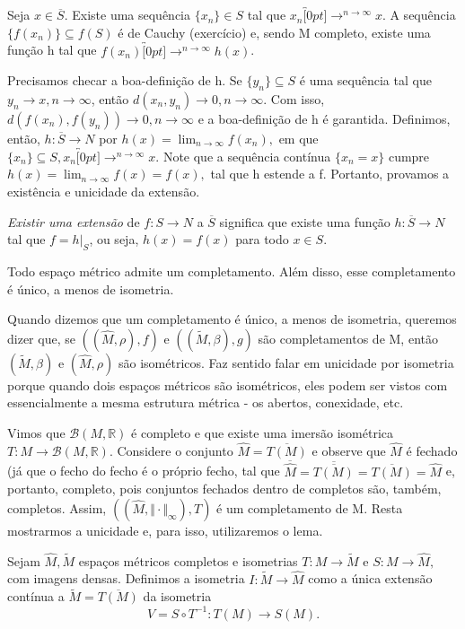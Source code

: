 \documentclass[metric_notes.tex]{subfiles}
\begin{document}
\begin{proof*}
	Seja \(x\in \overline{S}.\) Existe uma sequência \(\{x_{n}\}\in S\) tal que \(x_{n}\overbracket[0pt]{\longrightarrow}^{n\to \infty}x\). A sequência \(\{f(x_{n})\}\subseteq{f(S)}\)
	é de Cauchy (exercício) e, sendo M completo, existe uma função h tal que \(f(x_{n})\overbracket[0pt]{\longrightarrow}^{n\to \infty}h(x)\).

	Precisamos checar a boa-definição de h. Se \(\{y_{n}\}\subseteq{S}\) é uma sequência tal que \(y_{n}\longrightarrow x, n\rightarrow \infty\), então \(d(x_{n}, y_{n})\longrightarrow 0, n\rightarrow \infty\).
	Com isso, \(d(f(x_{n}), f(y_{n}))\longrightarrow 0, n\rightarrow \infty\) e a boa-definição de h é garantida. Definimos, então, \(h:\overline{S}\rightarrow N\) por
	\(h(x) = \lim_{n\to \infty}f(x_{n}),\) em que \(\{x_{n}\}\subseteq{S}, x_{n}\overbracket[0pt]{\longrightarrow}^{n\to \infty}x.\) Note que a sequência contínua
	\(\{x_{n} = x\}\) cumpre \(h(x) = \lim_{n\to \infty}f(x) = f(x),\) tal que h estende a f. Portanto, provamos a existência e unicidade da extensão. \qedsymbol
\end{proof*}
\textit{Existir uma extensão} de \(f:S\rightarrow N\) a \(\overline{S}\) significa que existe uma função \(h:\overline{S}\rightarrow N\) tal que \(f = h |_S\), ou seja,
\(h(x) = f(x)\) para todo \(x\in S\).
\begin{theorem*}
	Todo espaço métrico admite um completamento. Além disso, esse completamento é único, a menos de isometria.
\end{theorem*}
Quando dizemos que um completamento é único, a menos de isometria, queremos dizer que, se \(((\hat{M}, \rho ), f)\) e \(((\tilde{M}, \beta ), g)\) são completamentos de M,
então \((\tilde{M}, \beta )\) e \((\hat{M}, \rho )\) são isométricos. Faz sentido falar em unicidade por isometria porque quando dois espaços métricos são isométricos, eles podem
ser vistos com essencialmente a mesma estrutura métrica - os abertos, conexidade, etc.
\begin{proof*}
	Vimos que \(\mathcal{B}(M, \mathbb{R})\) é completo e que existe uma imersão isométrica \(T:M\rightarrow \mathcal{B}(M, \mathbb{R}).\) Considere o conjunto \(\hat{M} = \overline{T(M)}\)
	e observe que \(\hat{M}\) é fechado (já que o fecho do fecho é o próprio fecho, tal que \(\overline{\hat{M}} = \overline{\overline{T(M)}} = \overline{T(M)} = \hat{M}\) e, portanto,
	completo, pois conjuntos fechados dentro de completos são, também, completos. Assim, \(((\hat{M}, \Vert \cdot \Vert _{\infty}), T)\) é um completamento de M. Resta mostrarmos a unicidade e, para
	isso, utilizaremos o lema.

	Sejam \(\hat{M}, \tilde{M}\) espaços métricos completos e isometrias \(T:M\rightarrow \tilde{M}\) e \(S:M\rightarrow \hat{M},\) com imagens densas. Definimos a isometria
	\(I:\tilde{M}\rightarrow \hat{M}\) como a única extensão contínua a \(\tilde{M} = \overline{T(M)}\) da isometria
	\[
		V = S \circ{T^{-1}}:T(M)\rightarrow S(M).
	\]
\end{proof*}
\end{document}
